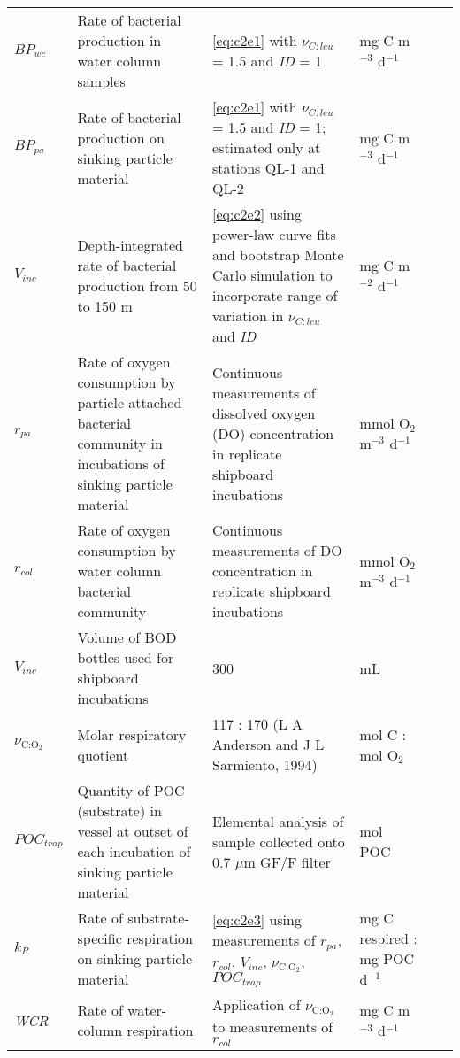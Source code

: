 \begin{landscape}
\begin{footnotesize}
\begin{singlespace}
\begin{longtable}{ Lp{.10\linewidth} p{.35\linewidth} p{.35\linewidth} Lp{.15\linewidth} }
${BP}_{wc}$ & Rate of bacterial production in water column samples & \autoref{eq:c2e1} with ${\nu _{C:leu}}$  = 1.5 and \emph{ID} = 1 & mg C m$^{-3}$ d$^{-1}$ \\

${BP}_{pa}$ & Rate of bacterial production on sinking particle material & \autoref{eq:c2e1} with ${\nu _{C:leu}}$  = 1.5 and \emph{ID} = 1; estimated only at stations QL-1 and QL-2 & mg C m$^{-3}$ d$^{-1}$ \\

${V}_{inc}$ & Depth-integrated rate of bacterial production from 50 to 150 m & \autoref{eq:c2e2} using power-law curve fits and bootstrap Monte Carlo simulation to incorporate range of variation in ${\nu _{C:leu}}$  and \emph{ID} & mg C m$^{-2}$ d$^{-1}$ \\

${r}_{pa}$ & Rate of oxygen consumption by particle-attached bacterial community in incubations of sinking particle material & Continuous measurements of dissolved oxygen (DO) concentration in replicate shipboard incubations & mmol O$_2$ m$^{-3}$ d$^{-1}$ \\

${r}_{col}$ & Rate of oxygen consumption by water column bacterial community & Continuous measurements of DO concentration in replicate shipboard incubations & mmol O$_2$ m$^{-3}$ d$^{-1}$ \\

${V}_{inc}$ & Volume of BOD bottles used for shipboard incubations & 300 & mL \\

$\nu _{{\text{C:}}{{\text{O}}_{\text{2}}}}$ & Molar respiratory quotient & 117 : 170 (L A Anderson and J L Sarmiento, 1994) & mol C : mol O$_2$ \\

${POC}_{trap}$ & Quantity of POC (substrate) in vessel at outset of each incubation of sinking particle material & Elemental analysis of sample collected onto 0.7 $\mu$m GF/F filter & mol POC \\

${k}_{R}$ & Rate of substrate-specific respiration on sinking particle material & \autoref{eq:c2e3} using measurements of ${r}_{pa}$, ${r}_{col}$, ${V}_{inc}$, $\nu _{{\text{C:}}{{\text{O}}_{\text{2}}}}$, ${POC}_{trap}$ & mg C respired : mg POC d$^{-1}$	 \\

\emph{WCR} & Rate of water-column respiration & Application of $\nu _{{\text{C:}}{{\text{O}}_{\text{2}}}}$ to measurements of ${r}_{col}$ & mg C m$^{-3}$ d$^{-1}$ \\


\end{longtable}
\end{singlespace}
\end{footnotesize}
\end{landscape}
